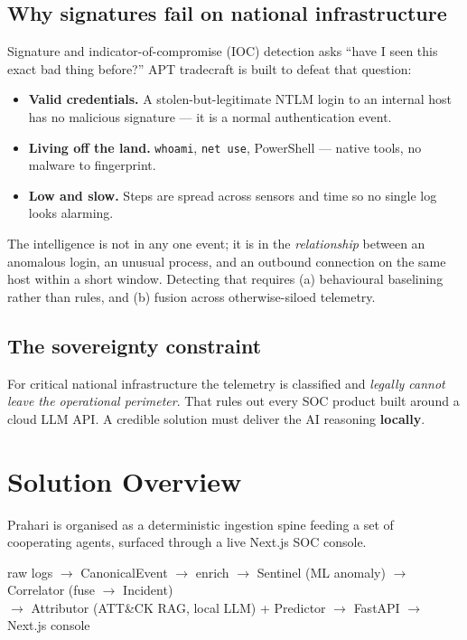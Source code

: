 \documentclass[11pt,a4paper]{article}
\begin{document}
\subsection{Why signatures fail on national infrastructure}

Signature and indicator-of-compromise (IOC) detection asks ``have I seen this exact bad thing
before?'' APT tradecraft is built to defeat that question:

\begin{itemize}[leftmargin=1.4em,itemsep=2pt]
  \item \textbf{Valid credentials.} A stolen-but-legitimate NTLM login to an internal host has
        no malicious signature — it is a normal authentication event.
  \item \textbf{Living off the land.} \texttt{whoami}, \texttt{net use}, PowerShell — native
        tools, no malware to fingerprint.
  \item \textbf{Low and slow.} Steps are spread across sensors and time so no single log looks
        alarming.
\end{itemize}

The intelligence is not in any one event; it is in the \emph{relationship} between an
anomalous login, an unusual process, and an outbound connection on the same host within a
short window. Detecting that requires (a) behavioural baselining rather than rules, and
(b) fusion across otherwise-siloed telemetry.

\subsection{The sovereignty constraint}

For critical national infrastructure the telemetry is classified and \emph{legally cannot
leave the operational perimeter}. That rules out every SOC product built around a cloud LLM
API. A credible solution must deliver the AI reasoning \textbf{locally}.

\section{Solution Overview}

Prahari is organised as a deterministic ingestion spine feeding a set of cooperating agents,
surfaced through a live Next.js SOC console.

\begin{keybox}
\begin{center}
\ttfamily\small
raw logs $\rightarrow$ CanonicalEvent $\rightarrow$ enrich $\rightarrow$ Sentinel (ML anomaly)
$\rightarrow$ Correlator (fuse $\rightarrow$ Incident) \\[2pt]
$\rightarrow$ Attributor (ATT\&CK RAG, local LLM) + Predictor $\rightarrow$ FastAPI $\rightarrow$ Next.js console
\end{center}
\end{keybox}
\end{document}
